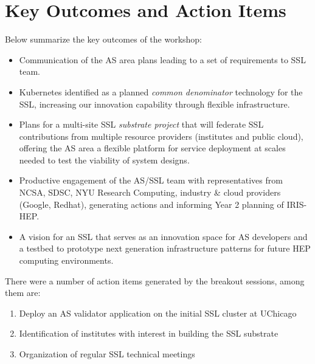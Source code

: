 \documentclass[11pt,letterpaper,fleqn]{article}
\begin{document}
\section{Key Outcomes and Action Items}
\vspace{0.2cm}
Below summarize the key outcomes of the workshop:
\begin{itemize}
  \item Communication of the AS area plans leading to a set of requirements to SSL team.
  \item Kubernetes identified as a planned {\it common denominator} technology for the SSL, increasing our innovation capability through flexible infrastructure.
  \item Plans for a multi-site SSL {\it substrate project} that will federate SSL contributions from multiple resource providers (institutes and public cloud), offering the AS area a flexible platform for service deployment at scales needed to test the viability of system designs.
  \item Productive engagement of the AS/SSL team with representatives from NCSA, SDSC, NYU Research Computing, industry \& cloud providers (Google, Redhat), generating actions and informing Year 2 planning of IRIS-HEP.
  \item A vision for an SSL that serves as an innovation space for AS developers and a testbed to prototype next generation infrastructure patterns for future HEP computing environments.
\end{itemize}
There were a number of action items generated by the breakout sessions, among them are:
\begin{enumerate}
  \item Deploy an AS validator application on the initial SSL cluster at UChicago
  \item Identification of institutes with interest in building the SSL substrate
  \item Organization of regular SSL technical meetings
\end{enumerate}
\end{document}
